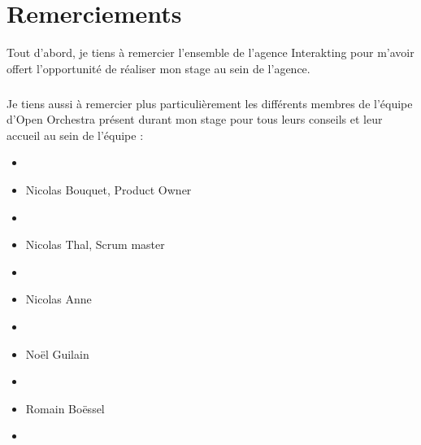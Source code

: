 \chapter*{Remerciements}
Tout d'abord, je tiens à remercier l'ensemble de l'agence Interakting pour m'avoir offert l'opportunité de réaliser mon stage au sein de l'agence.
\paragraph{}
Je tiens aussi à remercier plus particulièrement les différents membres de l'équipe d'Open Orchestra présent durant mon stage pour tous leurs conseils et leur accueil au sein de l'équipe : 

\begin{itemize}
\item[]
\item Nicolas Bouquet, Product Owner
\item[]
\item Nicolas Thal, Scrum master
\item[]
\item Nicolas Anne 
\item[]
\item Noël Guilain
\item[]
\item Romain Boëssel
\item[]
\end{itemize}